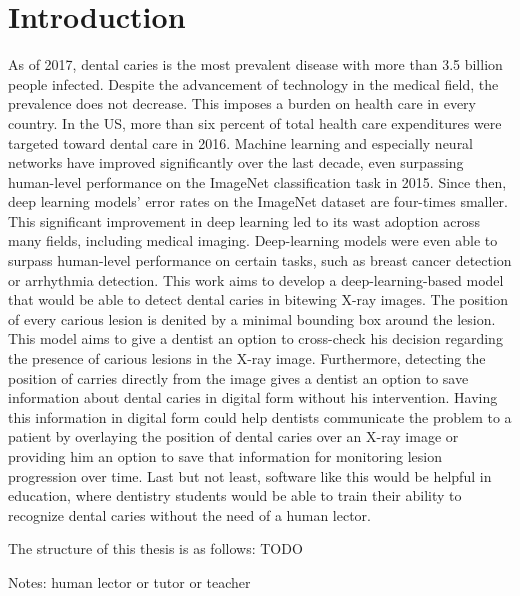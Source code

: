 \chapter{Introduction}

As of 2017, dental caries is the most prevalent disease \cite{Kassebaum2015}\cite{James2018} with more than 3.5 billion people infected. Despite the advancement of technology in the medical field, the prevalence does not decrease. This imposes a burden on health care in every country. In the US, more than six percent of total health care expenditures were targeted toward dental care in 2016\cite{Hung2020}.
\newline
Machine learning and especially neural networks have improved significantly over the last decade, even surpassing human-level performance on the ImageNet classification task in 2015\cite{He2015ICCV}. Since then, deep learning models' error rates on the ImageNet dataset are four-times smaller\cite{paperwithcode}. This significant improvement in deep learning led to its wast adoption across many fields, including medical imaging. Deep-learning models were even able to surpass human-level performance on certain tasks, such as breast cancer detection\cite{RodriguezRuiz2019} or arrhythmia detection\cite{Hannun2019}.
\newline
This work aims to develop a deep-learning-based model that would be able to detect dental caries in bitewing X-ray images. The position of every carious lesion is denited by a minimal bounding box around the lesion. This model aims to give a dentist an option to cross-check his decision regarding the presence of carious lesions in the X-ray image. Furthermore, detecting the position of carries directly from the image gives a dentist an option to save information about dental caries in digital form without his intervention. Having this information in digital form could help dentists communicate the problem to a patient by overlaying the position of dental caries over an X-ray image or providing him an option to save that information for monitoring lesion progression over time. Last but not least, software like this would be helpful in education, where dentistry students would be able to train their ability to recognize dental caries without the need of a human lector.


The structure of this thesis is as follows: TODO

Notes: human lector or tutor or teacher